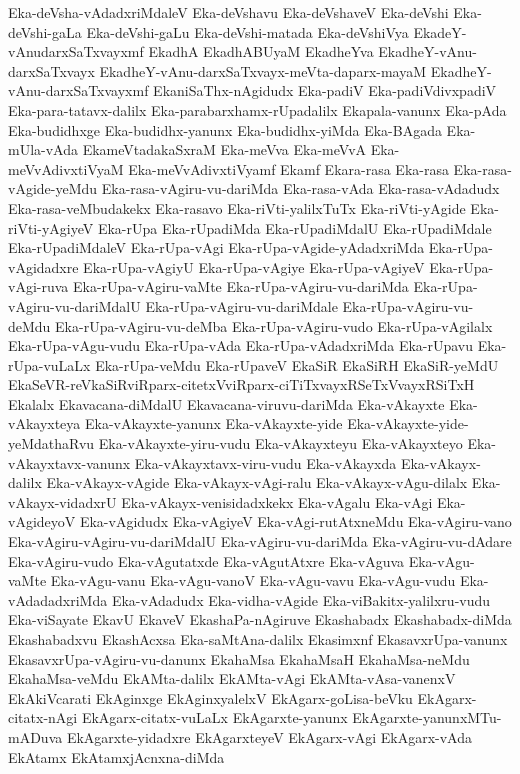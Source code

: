 {Eka-deVsha-vAdadxriMdaleV
Eka-deVshavu
Eka-deVshaveV
Eka-deVshi
Eka-deVshi-gaLa
Eka-deVshi-gaLu
Eka-deVshi-matada
Eka-deVshiVya
EkadeY-vAnudarxSaTxvayxmf
EkadhA
EkadhABUyaM
EkadheYva
EkadheY-vAnu-darxSaTxvayx
EkadheY-vAnu-darxSaTxvayx-meVta-daparx-mayaM
EkadheY-vAnu-darxSaTxvayxmf
EkaniSaThx-nAgidudx
Eka-padiV
Eka-padiVdivxpadiV
Eka-para-tatavx-dalilx
Eka-parabarxhamx-rUpadalilx
Ekapala-vanunx
Eka-pAda
Eka-budidhxge
Eka-budidhx-yanunx
Eka-budidhx-yiMda
Eka-BAgada
Eka-mUla-vAda
EkameVtadakaSxraM
Eka-meVva
Eka-meVvA
Eka-meVvAdivxtiVyaM
Eka-meVvAdivxtiVyamf
Ekamf
Ekara-rasa
Eka-rasa
Eka-rasa-vAgide-yeMdu
Eka-rasa-vAgiru-vu-dariMda
Eka-rasa-vAda
Eka-rasa-vAdadudx
Eka-rasa-veMbudakekx
Eka-rasavo
Eka-riVti-yalilxTuTx
Eka-riVti-yAgide
Eka-riVti-yAgiyeV
Eka-rUpa
Eka-rUpadiMda
Eka-rUpadiMdalU
Eka-rUpadiMdale
Eka-rUpadiMdaleV
Eka-rUpa-vAgi
Eka-rUpa-vAgide-yAdadxriMda
Eka-rUpa-vAgidadxre
Eka-rUpa-vAgiyU
Eka-rUpa-vAgiye
Eka-rUpa-vAgiyeV
Eka-rUpa-vAgi-ruva
Eka-rUpa-vAgiru-vaMte
Eka-rUpa-vAgiru-vu-dariMda
Eka-rUpa-vAgiru-vu-dariMdalU
Eka-rUpa-vAgiru-vu-dariMdale
Eka-rUpa-vAgiru-vu-deMdu
Eka-rUpa-vAgiru-vu-deMba
Eka-rUpa-vAgiru-vudo
Eka-rUpa-vAgilalx
Eka-rUpa-vAgu-vudu
Eka-rUpa-vAda
Eka-rUpa-vAdadxriMda
Eka-rUpavu
Eka-rUpa-vuLaLx
Eka-rUpa-veMdu
Eka-rUpaveV
EkaSiR
EkaSiRH
EkaSiR-yeMdU
EkaSeVR-reVkaSiRviRparx-citetxVviRparx-ciTiTxvayxRSeTxVvayxRSiTxH
Ekalalx
Ekavacana-diMdalU
Ekavacana-viruvu-dariMda
Eka-vAkayxte
Eka-vAkayxteya
Eka-vAkayxte-yanunx
Eka-vAkayxte-yide
Eka-vAkayxte-yide-yeMdathaRvu
Eka-vAkayxte-yiru-vudu
Eka-vAkayxteyu
Eka-vAkayxteyo
Eka-vAkayxtavx-vanunx
Eka-vAkayxtavx-viru-vudu
Eka-vAkayxda
Eka-vAkayx-dalilx
Eka-vAkayx-vAgide
Eka-vAkayx-vAgi-ralu
Eka-vAkayx-vAgu-dilalx
Eka-vAkayx-vidadxrU
Eka-vAkayx-venisidadxkekx
Eka-vAgalu
Eka-vAgi
Eka-vAgideyoV
Eka-vAgidudx
Eka-vAgiyeV
Eka-vAgi-rutAtxneMdu
Eka-vAgiru-vano
Eka-vAgiru-vAgiru-vu-dariMdalU
Eka-vAgiru-vu-dariMda
Eka-vAgiru-vu-dAdare
Eka-vAgiru-vudo
Eka-vAgutatxde
Eka-vAgutAtxre
Eka-vAguva
Eka-vAgu-vaMte
Eka-vAgu-vanu
Eka-vAgu-vanoV
Eka-vAgu-vavu
Eka-vAgu-vudu
Eka-vAdadadxriMda
Eka-vAdadudx
Eka-vidha-vAgide
Eka-viBakitx-yalilxru-vudu
Eka-viSayate
EkavU
EkaveV
EkashaPa-nAgiruve
Ekashabadx
Ekashabadx-diMda
Ekashabadxvu
EkashAcxsa
Eka-saMtAna-dalilx
Ekasimxnf
EkasavxrUpa-vanunx
EkasavxrUpa-vAgiru-vu-danunx
EkahaMsa
EkahaMsaH
EkahaMsa-neMdu
EkahaMsa-veMdu
EkAMta-dalilx
EkAMta-vAgi
EkAMta-vAsa-vanenxV
EkAkiVcarati
EkAginxge
EkAginxyalelxV
EkAgarx-goLisa-beVku
EkAgarx-citatx-nAgi
EkAgarx-citatx-vuLaLx
EkAgarxte-yanunx
EkAgarxte-yanunxMTu-mADuva
EkAgarxte-yidadxre
EkAgarxteyeV
EkAgarx-vAgi
EkAgarx-vAda
EkAtamx
EkAtamxjAcnxna-diMda
}
